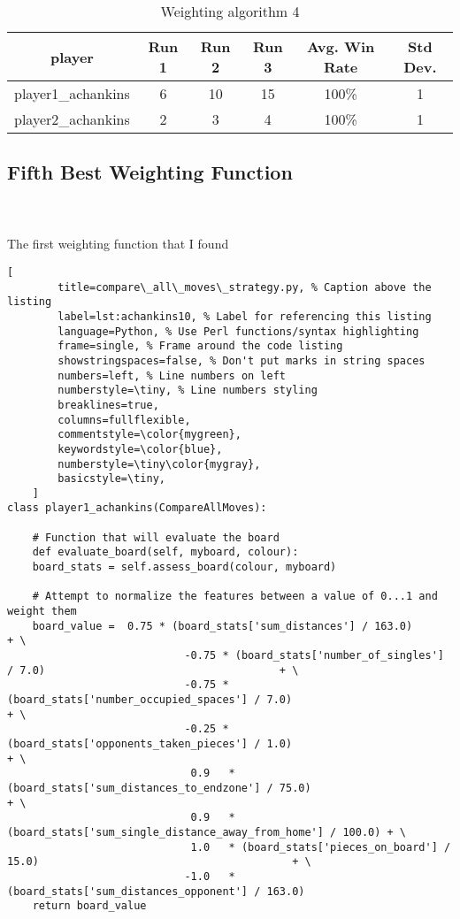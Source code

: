 \documentclass[
	12pt, %
]{fphw}
\begin{document}
\begin{table}[ht]
	\centering
	\begin{tabular}{||c | c c c c c||}
		\hline
		player & Run 1&   Run 2 & Run 3 & Avg. Win Rate & Std Dev. \\ [0.5ex]
		\hline\hline
		player1\_achankins &  6 & 10 & 15 & 100\% & 1 \\
		\hline
		player2\_achankins & 2 & 3 & 4 & 100\% & 1 \\ [1ex]
		\hline
	\end{tabular}
	\caption{Weighting algorithm 4}
	\label{table:4}
\end{table}

\pagebreak

\subsection*{Fifth Best Weighting Function}

\hfill\\ \\  The first weighting function that I found

\begin{lstlisting}[
		title=compare\_all\_moves\_strategy.py, % Caption above the listing
		label=lst:achankins10, % Label for referencing this listing
		language=Python, % Use Perl functions/syntax highlighting
		frame=single, % Frame around the code listing
		showstringspaces=false, % Don't put marks in string spaces
		numbers=left, % Line numbers on left
		numberstyle=\tiny, % Line numbers styling
		breaklines=true,
		columns=fullflexible,
		commentstyle=\color{mygreen},
		keywordstyle=\color{blue},
		numberstyle=\tiny\color{mygray},
		basicstyle=\tiny,
	]
class player1_achankins(CompareAllMoves):

    # Function that will evaluate the board
    def evaluate_board(self, myboard, colour):
    board_stats = self.assess_board(colour, myboard)

    # Attempt to normalize the features between a value of 0...1 and weight them
    board_value =  0.75 * (board_stats['sum_distances'] / 163.0)                                        + \
                            -0.75 * (board_stats['number_of_singles'] / 7.0)                                     + \
                            -0.75 * (board_stats['number_occupied_spaces'] / 7.0)                          + \
                            -0.25 * (board_stats['opponents_taken_pieces'] / 1.0)                            + \
                             0.9   * (board_stats['sum_distances_to_endzone'] / 75.0)                      + \
                             0.9   * (board_stats['sum_single_distance_away_from_home'] / 100.0) + \
                             1.0   * (board_stats['pieces_on_board'] / 15.0)                                        + \
                            -1.0   * (board_stats['sum_distances_opponent'] / 163.0)
    return board_value

\end{lstlisting}
\end{document}
